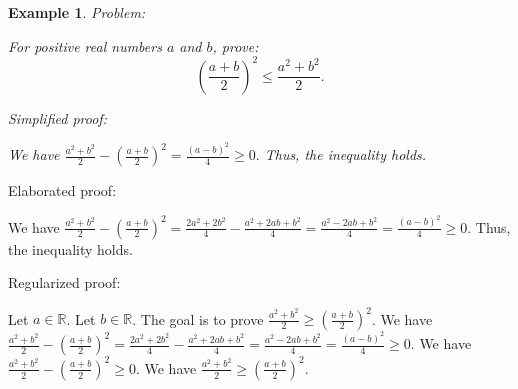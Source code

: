 \documentclass{article}
\newtheorem{example}{Example}
\begin{document}
\begin{example}
Problem:
\begin{tcolorbox}[colback=yellow!10, width=\linewidth]
For positive real numbers $a$ and $b$, prove:
    $$\left(\frac{a+b}{2}\right)^2 \leq \frac{a^2+b^2}{2}.$$
\end{tcolorbox}

Simplified proof:
\begin{tcolorbox}[colback=blue!10, width=\linewidth]
We have
$ \frac{a^2+b^2}{2} - \left(\frac{a+b}{2}\right)^2 = \frac{(a-b)^2}{4} \ge 0. $
Thus, the inequality holds.
\end{tcolorbox}
\end{example}

Elaborated proof:
\begin{tcolorbox}[colback=green!10, width=\linewidth]
We have
$ \frac{a^2+b^2}{2} - \left(\frac{a+b}{2}\right)^2 = \frac{2a^2+2b^2}{4} - \frac{a^2+2ab+b^2}{4} = \frac{a^2-2ab+b^2}{4} = \frac{(a-b)^2}{4} \ge 0. $
Thus, the inequality holds.
\end{tcolorbox}

Regularized proof:
\begin{tcolorbox}[colback=red!10, width=\linewidth]
Let $a\in\mathbb{R}$.
Let $b\in\mathbb{R}$.
The goal is to prove $\frac{a^2+b^2}{2} \ge {\left(\frac{a+b}{2}\right)}^2$.
We have $\frac{a^2+b^2}{2} - {\left(\frac{a+b}{2}\right)}^2 = \frac{2a^2+2b^2}{4} - \frac{a^2+2ab+b^2}{4} = \frac{a^2-2ab+b^2}{4} = \frac{{{(a-b)}}^2}{4} \ge 0$.
We have $\frac{a^2+b^2}{2} - {\left(\frac{a+b}{2}\right)}^2 \ge 0$.
We have $\frac{a^2+b^2}{2} \ge {\left(\frac{a+b}{2}\right)}^2$.
\end{tcolorbox}
\end{document}
